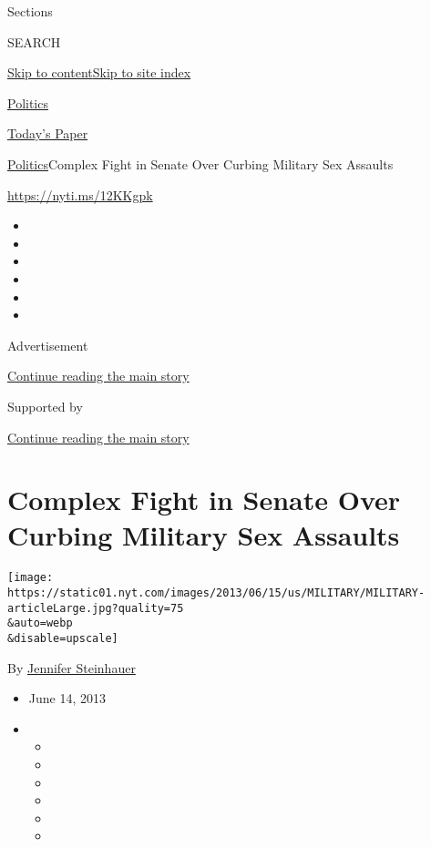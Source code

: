 Sections

SEARCH

\protect\hyperlink{site-content}{Skip to
content}\protect\hyperlink{site-index}{Skip to site index}

\href{https://www.nytimes.com/section/politics}{Politics}

\href{https://myaccount.nytimes.com/auth/login?response_type=cookie\&client_id=vi}{}

\href{https://www.nytimes.com/section/todayspaper}{Today's Paper}

\href{/section/politics}{Politics}\textbar{}Complex Fight in Senate Over
Curbing Military Sex Assaults

\url{https://nyti.ms/12KKgpk}

\begin{itemize}
\item
\item
\item
\item
\item
\item
\end{itemize}

Advertisement

\protect\hyperlink{after-top}{Continue reading the main story}

Supported by

\protect\hyperlink{after-sponsor}{Continue reading the main story}

\hypertarget{complex-fight-in-senate-over-curbing-military-sex-assaults}{%
\section{Complex Fight in Senate Over Curbing Military Sex
Assaults}\label{complex-fight-in-senate-over-curbing-military-sex-assaults}}

\texttt{[image: https://static01.nyt.com/images/2013/06/15/us/MILITARY/MILITARY-articleLarge.jpg?quality=75\\\&auto=webp\\\&disable=upscale]}

By \href{https://www.nytimes.com/by/jennifer-steinhauer}{Jennifer
Steinhauer}

\begin{itemize}
\item
  June 14, 2013
\item
  \begin{itemize}
  \item
  \item
  \item
  \item
  \item
  \item
  \end{itemize}
\end{itemize}

